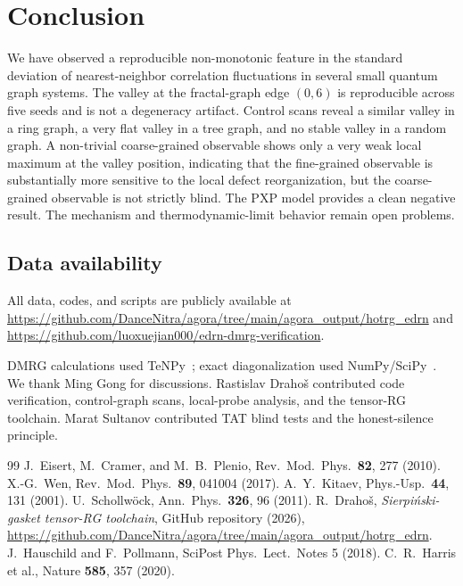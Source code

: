 \documentclass[aps,prb,reprint,superscriptaddress]{revtex4-2}
\begin{document}
\section{Conclusion}

We have observed a reproducible non-monotonic feature in the standard deviation of nearest-neighbor correlation fluctuations in several small quantum graph systems. The valley at the fractal-graph edge $(0,6)$ is reproducible across five seeds and is not a degeneracy artifact. Control scans reveal a similar valley in a ring graph, a very flat valley in a tree graph, and no stable valley in a random graph. A non-trivial coarse-grained observable shows only a very weak local maximum at the valley position, indicating that the fine-grained observable is substantially more sensitive to the local defect reorganization, but the coarse-grained observable is not strictly blind. The PXP model provides a clean negative result. The mechanism and thermodynamic-limit behavior remain open problems.

\subsection*{Data availability}
All data, codes, and scripts are publicly available at \url{https://github.com/DanceNitra/agora/tree/main/agora_output/hotrg_edrn} and \url{https://github.com/luoxuejian000/edrn-dmrg-verification}.

\begin{acknowledgments}
DMRG calculations used TeNPy~\cite{Hauschild2018,Schollwock2011}; exact diagonalization used NumPy/SciPy~\cite{Harris2020}. We thank Ming Gong for discussions. Rastislav Draho\v{s} contributed code verification, control-graph scans, local-probe analysis, and the tensor-RG toolchain. Marat Sultanov contributed TAT blind tests and the honest-silence principle.
\end{acknowledgments}

\begin{thebibliography}{99}
 J.~Eisert, M.~Cramer, and M.~B.~Plenio, Rev.\ Mod.\ Phys.\ \textbf{82}, 277 (2010).
 X.-G.~Wen, Rev.\ Mod.\ Phys.\ \textbf{89}, 041004 (2017).
 A.~Y.~Kitaev, Phys.-Usp.\ \textbf{44}, 131 (2001).
 U.~Schollw\"{o}ck, Ann.\ Phys.\ \textbf{326}, 96 (2011).
 R.~Draho\v{s}, \emph{Sierpi\'{n}ski-gasket tensor-RG toolchain}, GitHub repository (2026), \url{https://github.com/DanceNitra/agora/tree/main/agora_output/hotrg_edrn}.
 J.~Hauschild and F.~Pollmann, SciPost Phys.\ Lect.\ Notes 5 (2018).
 C.~R.~Harris et al., Nature \textbf{585}, 357 (2020).
\end{thebibliography}
\end{document}
